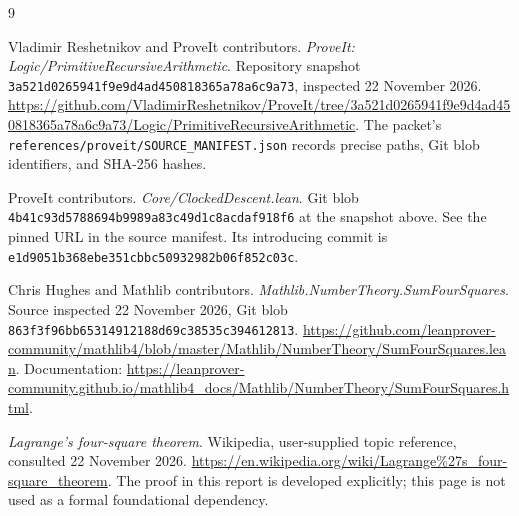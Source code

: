 \documentclass[11pt,letterpaper]{article}
\newcommand{\code}[1]{\texttt{#1}}
\theoremstyle{definition}
\begin{document}






\appendix


\begin{thebibliography}{9}
\raggedright
{}
Vladimir Reshetnikov and ProveIt contributors.
\emph{ProveIt: Logic/PrimitiveRecursiveArithmetic}.
Repository snapshot
\texttt{3a521d0265941f9e9d4ad450818365a78a6c9a73}, inspected 22 November 2026.
\url{https://github.com/VladimirReshetnikov/ProveIt/tree/3a521d0265941f9e9d4ad450818365a78a6c9a73/Logic/PrimitiveRecursiveArithmetic}.
The packet's \code{references/proveit/SOURCE\_MANIFEST.json} records precise
paths, Git blob identifiers, and SHA-256 hashes.

ProveIt contributors. \emph{Core/ClockedDescent.lean}.
Git blob \texttt{4b41c93d5788694b9989a83c49d1c8acdaf918f6} at the snapshot above.
See the pinned URL in the source manifest. Its introducing commit is
\texttt{e1d9051b368ebe351cbbc50932982b06f852c03c}.

Chris Hughes and Mathlib contributors.
\emph{Mathlib.NumberTheory.SumFourSquares}.
Source inspected 22 November 2026, Git blob
\texttt{863f3f96bb65314912188d69c38535c394612813}.
\url{https://github.com/leanprover-community/mathlib4/blob/master/Mathlib/NumberTheory/SumFourSquares.lean}.
Documentation:
\url{https://leanprover-community.github.io/mathlib4_docs/Mathlib/NumberTheory/SumFourSquares.html}.

\emph{Lagrange's four-square theorem}. Wikipedia, user-supplied topic reference,
consulted 22 November 2026.
\url{https://en.wikipedia.org/wiki/Lagrange%27s_four-square_theorem}.
The proof in this report is developed explicitly; this page is not used as
a formal foundational dependency.
\end{thebibliography}
\end{document}
